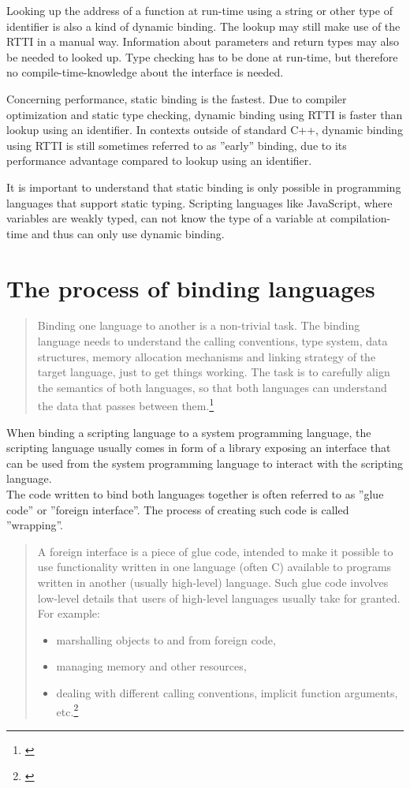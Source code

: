 Looking up the address of a function at run-time using a string or other type of identifier is also a kind of dynamic binding. The lookup may still make use of the RTTI in a manual way. Information about parameters and return types may also be needed to looked up. Type checking has to be done at run-time, but therefore no compile-time-knowledge about the interface is needed.

Concerning performance, static binding is the fastest. Due to compiler optimization and static type checking, dynamic binding using RTTI is faster than lookup using an identifier. In contexts outside of standard C++, dynamic binding using RTTI is still sometimes referred to as ''early'' binding, due to its performance advantage compared to lookup using an identifier.

It is important to understand that static binding is only possible in programming languages that support static typing. Scripting languages like JavaScript, where variables are weakly typed, can not know the type of a variable at compilation-time and thus can only use dynamic binding.

\section{The process of binding languages}

\begin{quotation}
Binding one language to another is a non-trivial task. The binding language needs to understand the calling conventions, type system, data structures, memory allocation mechanisms and linking strategy of the target language, just to get things working. The task is to carefully align the semantics of both languages, so that both languages can understand the data that passes between them.\footnote{\citep{RealWorldHaskell}}
\end{quotation}

When binding a scripting language to a system programming language, the scripting language usually comes in form of a library exposing an interface that can be used from the system programming language to interact with the scripting language.\\
The code written to bind both languages together is often referred to as ''glue code'' or ''foreign interface''. The process of creating such code is called ''wrapping''.

\begin{quotation}
A foreign interface is a piece of glue code, intended to make it possible to use functionality written in one language (often C) available to programs written in another (usually high-level) language. Such glue code involves low-level details that users of high-level languages usually take for granted. For example:
\begin{itemize}
\item marshalling objects to and from foreign code,
\item managing memory and other resources,
\item dealing with different calling conventions, implicit function arguments, etc.\footnote{\citep{FFIScheme}}
\end{itemize}
\end{quotation}

